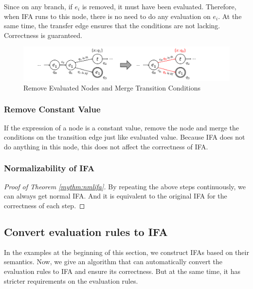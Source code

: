 Since on any branch, if $e_i$ is removed, it must have been evaluated. Therefore, when IFA runs to this node, there is no need to do any evaluation on $e_i$. At the same time, the transfer edge ensures that the conditions are not lacking. Correctness is guaranteed.

\begin{figure}[t]
	\centering
	\includegraphics[scale=0.25]{images/nmlifa/nmlifa-merge.png}
	\caption{Remove Evaluated Nodes and Merge Transition Conditions}
	\label{fig:nmlifa-merge}
\end{figure}

\subsubsection{Remove Constant Value}

If the expression of a node is a constant value, remove the node and merge the conditions on the transition edge just like evaluated value. Because IFA does not do anything in this node, this does not affect the correctness of IFA.

\subsubsection{Normalizability of IFA}

\begin{proof}[Proof of Theorem \ref{mythm:nmlifa}]
By repeating the above steps continuously, we can always get normal IFA. And it is equivalent to the original IFA for the correctness of each step.
\end{proof}

\subsection{Convert evaluation rules to IFA}

In the examples at the beginning of this section, we construct IFAs based on their semantics. Now, we give an algorithm that can automatically convert the evaluation rules to IFA and ensure its correctness. But at the same time, it has stricter requirements on the evaluation rules.

